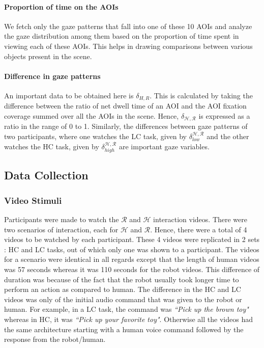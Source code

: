 \documentclass{acm_proc_article-sp}
\begin{document}
\paragraph{Proportion of time on the AOIs}

We fetch only the gaze patterns that fall into one of these 10 AOIs and analyze
the gaze distribution among them based on the proportion of time spent in
viewing each of these AOIs. This helps in drawing comparisons between various
objects present in the scene. 

\paragraph{Difference in gaze patterns}

An important data to be obtained here is $\delta_{H,R}$. This is calculated by
taking the difference between the ratio of net dwell time of an AOI and the AOI
fixation coverage summed over all the AOIs in the scene. Hence,
$\delta_{\mathcal{H},\mathcal{R}}$ is expressed as a ratio in the range of 0 to
1. Similarly, the differences between gaze patterns of two participants, where
one watches the LC task, given by $\delta_{low}^{\mathcal{H},\mathcal{R}}$ and
the other watches the HC task, given by
$\delta_{high}^{\mathcal{H},\mathcal{R}}$ are important gaze variables.

\subsection{Data Collection}

\subsubsection{Video Stimuli}

Participants were made to watch the $\mathcal{R}$ and $\mathcal{H}$ interaction
videos. There were two scenarios of interaction, each for $\mathcal{H}$ and
$\mathcal{R}$. Hence, there were a total of 4 videos to be watched by each
participant. These 4 videos were replicated in 2 sets : HC and LC tasks, out of
which only one was shown to a participant. The videos for a scenario were
identical in all regards except that the length of human videos was 57 seconds
whereas it was 110 seconds for the robot videos. This difference of duration was
because of the fact that the robot usually took longer time to perform an action
as compared to human. The difference in the HC and LC videos was only of the
initial audio command that was given to the robot or human. For example, in a LC
task, the command was \textit{``Pick up the brown toy"} whereas in HC, it was
\textit{``Pick up your favorite toy"}. Otherwise all the videos had the same
architecture starting with a human voice command followed by the response from
the robot/human.
\end{document}
